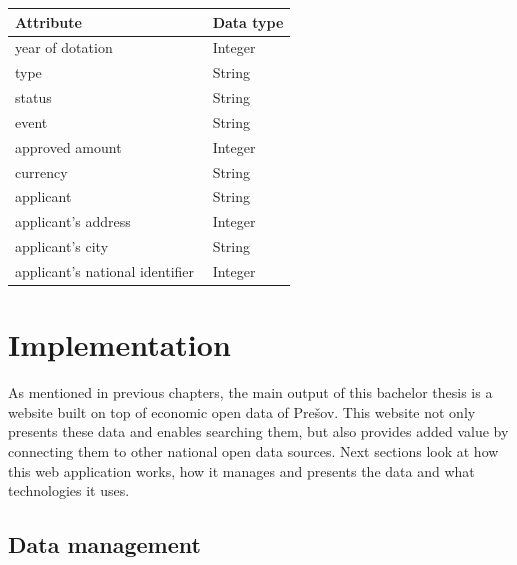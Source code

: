 \documentclass[thesis=B,english]{FITthesis}[2012/06/26]
\begin{document}
    \begin{center}
        \begin{tabular}{  p{0.7\linewidth} | p{0.3\linewidth} }
        Attribute & Data type\\ \hline
        year of dotation & Integer \\
        type & String \\
        status & String \\
        event & String \\
        approved amount & Integer \\
        currency & String \\
        applicant & String \\
        applicant's address & Integer \\
        applicant's city & String \\
        applicant's national identifier & Integer \\
        \end{tabular}
    \end{center}	
	
	\chapter{Implementation}
	As mentioned in previous chapters, the main output of this bachelor thesis is a website built on top of economic open data of Prešov. This website not only presents these data and enables searching them, but also provides added value by connecting them to other national open data sources. Next sections look at how this web application works, how it manages and presents the data and what technologies it uses.
	\section{Data management}
\end{document}
